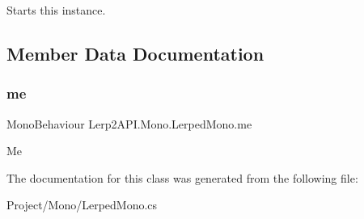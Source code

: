 Starts this instance. 



\subsection{Member Data Documentation}
\mbox{\label{class_lerp2_a_p_i_1_1_mono_1_1_lerped_mono_a230428e35a8be741c1c220da4f5aea91}} 
\subsubsection{\texorpdfstring{me}{me}}
{\footnotesize\ttfamily Mono\+Behaviour Lerp2\+A\+P\+I.\+Mono.\+Lerped\+Mono.\+me\hspace{0.3cm}{\ttfamily [static]}}



Me 



The documentation for this class was generated from the following file\+:\begin{DoxyCompactItemize}
\item 
Project/\+Mono/Lerped\+Mono.\+cs\end{DoxyCompactItemize}
